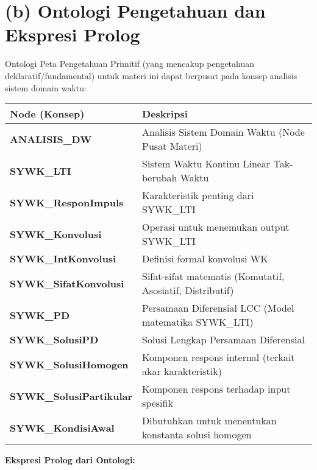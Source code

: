 \documentclass[
  letterpaper,
  DIV=11,
  numbers=noendperiod]{scrreprt}
\begin{document}
\section{(b) Ontologi Pengetahuan dan Ekspresi
Prolog}\label{b-ontologi-pengetahuan-dan-ekspresi-prolog}

Ontologi Peta Pengetahuan Primitif (yang mencakup pengetahuan
deklaratif/fundamental) untuk materi ini dapat berpusat pada konsep
analisis sistem domain waktu:

\begin{longtable}[]{@{}
  >{\raggedright\arraybackslash}p{}
  >{\raggedright\arraybackslash}p{}@{}}
\toprule\noalign{}
\begin{minipage}[b]{\linewidth}\raggedright
Node (Konsep)
\end{minipage} & \begin{minipage}[b]{\linewidth}\raggedright
Deskripsi
\end{minipage} \\
\midrule\noalign{}
\endhead
\bottomrule\noalign{}
\endlastfoot
\textbf{ANALISIS\_DW} & Analisis Sistem Domain Waktu (Node Pusat
Materi) \\
\textbf{SYWK\_LTI} & Sistem Waktu Kontinu Linear Tak-berubah Waktu \\
\textbf{SYWK\_ResponImpuls} & Karakteristik penting dari SYWK\_LTI \\
\textbf{SYWK\_Konvolusi} & Operasi untuk menemukan output SYWK\_LTI \\
\textbf{SYWK\_IntKonvolusi} & Definisi formal konvolusi WK \\
\textbf{SYWK\_SifatKonvolusi} & Sifat-sifat matematis (Komutatif,
Asosiatif, Distributif) \\
\textbf{SYWK\_PD} & Persamaan Diferensial LCC (Model matematika
SYWK\_LTI) \\
\textbf{SYWK\_SolusiPD} & Solusi Lengkap Persamaan Diferensial \\
\textbf{SYWK\_SolusiHomogen} & Komponen respons internal (terkait akar
karakteristik) \\
\textbf{SYWK\_SolusiPartikular} & Komponen respons terhadap input
spesifik \\
\textbf{SYWK\_KondisiAwal} & Dibutuhkan untuk menentukan konstanta
solusi homogen \\
\end{longtable}

\textbf{Ekspresi Prolog dari Ontologi:}
\end{document}
